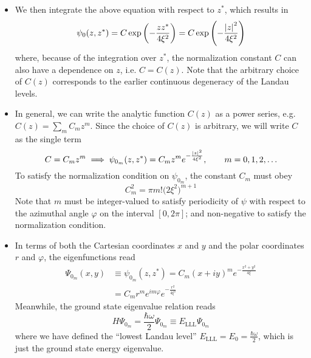\documentclass[11pt, a4paper]{article}
\newcommand{\p}{\psi}  %
\renewcommand{\P}{\Psi}  %
\begin{document}
\begin{itemize}
	\item We then integrate the above equation with respect to $ z^{*} $, which results in
	\begin{equation*}
		\p_{0}(z, z^{*}) = C\exp\left(-\frac{zz^{*}}{4\xi^{2}}\right) = C\exp\left(-\frac{\abs{z}^{2}}{4\xi^{2}}\right) 
	\end{equation*}
	where, because of the integration over $ z^{*} $, the normalization constant $ C $ can also have a dependence on $ z $, i.e. $ C = C(z) $. Note that the arbitrary choice of $ C(z) $ corresponds to the earlier continuous degeneracy of the Landau levels.
	
	\item In general, we can write the analytic function $ C(z) $ as a power series, e.g. $ C(z) = \sum_{m}C_{m}z^{m} $. Since the choice of $ C(z) $ is arbitrary, we will write $ C $ as the single term
	\begin{equation*}
		C = C_{m}z^{m} \implies \p_{0_{m}}(z, z^{*}) = C_{m}z^{m}e^{-\frac{\abs{z}^{2}}{4\xi^{2}}}, \qquad m = 0, 1, 2, \ldots
	\end{equation*}
	To satisfy the normalization condition on $ \p_{0_{m}} $, the constant $ C_{m} $ must obey
	\begin{equation*}
		C_{m}^{2} = \pi m! \big(2\xi^{2}\big)^{m+1}
	\end{equation*}
	Note that $ m $ must be integer-valued to satisfy periodicity of $ \p $ with respect to the azimuthal angle $ \varphi $ on the interval $ [0, 2\pi] $; and non-negative to satisfy the normalization condition.
	

	\item In terms of both the Cartesian coordinates $ x $ and $ y $ and the polar coordinates $ r $ and $ \varphi $, the eigenfunctions read
	\begin{align*}
		\P_{0_{m}}(x, y) &\equiv \p_{0_{m}}(z, z^{*}) = C_{m}(x + iy)^{m}e^{-\frac{x^{2}+y^{2}}{4 \xi}}\\
		& = C_{m}r^{m}e^{im\varphi}e^{-\frac{r^{2}}{4\xi^{2}}}
	\end{align*}
	Meanwhile, the ground state eigenvalue relation reads
	\begin{equation*}
		H \P_{0_{m}} = \frac{\hbar \omega}{2}\P_{0_{m}} \equiv E_{\text{LLL}}\P_{0_{m}}
	\end{equation*}
	where we have defined the ``lowest Landau level'' $ E_{\text{LLL}} = E_{0} = \frac{\hbar\omega}{2}$, which is just the ground state energy eigenvalue.
	

\end{itemize}
\end{document}
